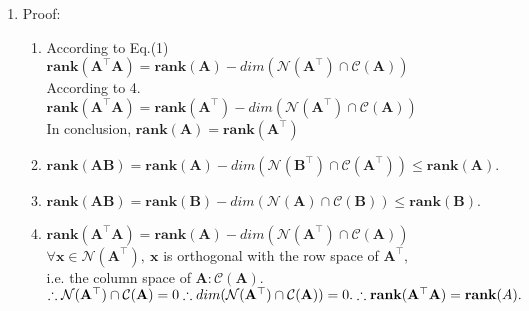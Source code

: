 \documentclass[11pt,letter,notitlepage]{article}
\newcommand{\rank}[1]{ \textbf{rank}  (#1)  }
\begin{document}
\begin{solution}
\begin{enumerate}
		\item Proof:
		\begin{enumerate}
		 \item 
		 According to Eq.(1)\\
		 $\rank{\mathbf{A^{\top}A}}=\rank{\mathbf{A}}-dim(\mathcal{N}(\mathbf{A^{\top}})\cap\mathcal{C}(\mathbf{A}))$\\
		 According to 4.\\
		 $\rank{\mathbf{A^{\top}A}}=\rank{\mathbf{A^{\top}}}-dim(\mathcal{N}(\mathbf{A^{\top}})\cap\mathcal{C}(\mathbf{A}))$\\
		 In conclusion, $\rank{\mathbf{A}}=\rank{\mathbf{A^{\top}}}$
		 \item
		 $\rank{\mathbf{AB}}=\rank{\mathbf{A}}-dim(\mathcal{N}(\mathbf{B^{\top}})\cap\mathcal{C}(\mathbf{A^{\top}}))\leqslant \rank{\mathbf{A}}.$
		 
		 \item
		 $\rank{\mathbf{AB}}=\rank{\mathbf{B}}-dim(\mathcal{N}(\mathbf{A})\cap\mathcal{C}(\mathbf{B}))\leqslant \rank{\mathbf{B}}.$
		 
		 \item
		 $\rank{\mathbf{A^{\top}A}}=\rank{\mathbf{A}}-dim(\mathcal{N}(\mathbf{A^{\top}})\cap\mathcal{C}(\mathbf{A}))$\\
		 $\forall \mathbf{x} \in \mathcal{N}(\mathbf{A^{\top}}),~\mathbf{x}$ is orthogonal with the row space of $\mathbf{A^{\top}},$ \\i.e. the column space of $\mathbf{A}: \mathcal{C}(\mathbf{A}).$\\
		 $\therefore \mathcal{N}(\mathbf{A^{\top}})\cap\mathcal{C}(\mathbf{A})=0\\
		 \therefore dim(\mathcal{N}(\mathbf{A^{\top}})\cap\mathcal{C}(\mathbf{A}))=0.\\
		 \therefore \rank{\mathbf{A^{\top}A}}=\rank{A}.$
		 
		\end{enumerate}

    \end{enumerate}
\end{solution}
\newpage
\end{document}

